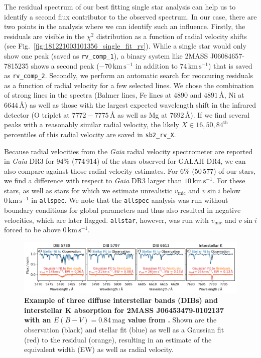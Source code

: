 \documentclass[
  journal=pasa,
  manuscript=research-paper, %
  year=2024,
  volume=37
]{cup-journal}
\newcommand{\vmic}{$v_\mathrm{mic}$\xspace}
\newcommand{\vsini}{$v \sin i$\xspace}
\newcommand{\Gaia}{\textit{Gaia}\xspace}
\begin{document}
The residual spectrum of our best fitting single star analysis can help us to identify a second flux contributor to the observed spectrum. In our case, there are two points in the analysis where we can identify such an influence. Firstly, the residuals are visible in the $\chi^2$ distribution as a function of radial velocity shifts (see Fig.~\ref{fig:181221003101356_single_fit_rv}). While a single star would only show one peak (saved as \texttt{rv\_comp\_1}), a binary system like 2MASS J06084657-7815235 shows a second peak ($-70\,\mathrm{km\,s^{-1}}$ in addition to $74\,\mathrm{km\,s^{-1}}$) that is saved as \texttt{rv\_comp\_2}. Secondly, we perform an automatic search for reoccuring residuals as a function of radial velocity for a few selected lines. We chose the combination of strong lines in the spectra (Balmer lines, Fe lines at 4890 and $4891\,\text{\AA}$, Ni at $6644\,\text{\AA}$) as well as those with the largest expected wavelength shift in the infrared detector (O triplet at $7772-7775\,\text{\AA}$ as well as Mg at $7692\,\text{\AA}$). If we find several peaks with a reasonably similar radial velocity, the likely $X \in {16,50,84}^\text{th}$ percentiles of this radial velocity are saved in \texttt{sb2\_rv\_X}.

Because radial velocities from the \Gaia radial velocity spectrometer \citep{Katz2023} are reported in \Gaia DR3 for 94\% (774\,914) of the stars observed for GALAH DR4, we can also compare against those radial velocity estimates. For 6\% (50\,577) of our stars, we find a difference with respect to \Gaia DR3 larger than $10\,\mathrm{km\,s^{-1}}$. For these stars, as well as stars for which we estimate unrealistic \vmic and \vsini below $0\,\mathrm{km\,s^{-1}}$ in \texttt{allspec}. We note that the \texttt{allspec} analysis was run without boundary conditions for global parameters and thus also resulted in negative velocities, which are later flagged. \texttt{allstar}, however, was run with \vmic and \vsini forced to be above $0\,\mathrm{km\,s^{-1}}$.

\begin{figure}[ht]
 \centering
 \includegraphics[width=\textwidth]{figures/example_dibs_06453479-0102137.png}
 \caption{\textbf{Example of three diffuse interstellar bands (DIBs) and interstellar K absorption for 2MASS J06453479-0102137 with an $E(B-V) = 0.84\,\mathrm{mag}$ value from \citet{Schlegel1998}.} Shown are the observation (black) and stellar fit (blue) as well as a Gaussian fit (red) to the residual (orange), resulting in an estimate of the equivalent width (EW) as well as radial velocity.} %
 \label{fig:example_dibs_06453479-0102137}
\end{figure}
\end{document}
